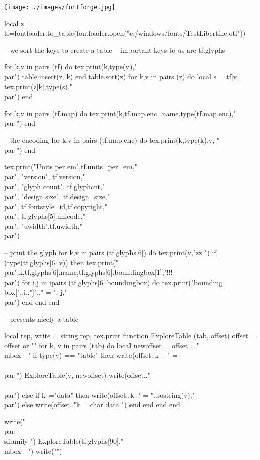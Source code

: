 \documentclass{article}
\begin{document}
\texttt{[image: ./images/fontforge.jpg]}
\newfontfamily{}
\begin{luacode*}
local z={}
tf=fontloader.to_table(fontloader.open("c:/windows/fonts/TestLibertine.otf"))

-- we sort the keys to create a table
-- important keys to us are tf.glyphs

for k,v in pairs (tf) do
   tex.print(k,type(v),"\\par")
   table.insert(z, k)
end
table.sort(z)
for k,v in pairs (z) do
   local s = tf[v]
   tex.print(z[k],type(s),"\\par")
end

for k,v in pairs (tf.map) do
   tex.print(k,tf.map.enc_name,type(tf.map.enc),"\\par ")
end

-- the encoding
for k,v in pairs (tf.map.enc) do
   tex.print(k,type(k),v, "\\par ")
end

tex.print("Units per em",tf.units_per_em,"\\par",
          "version", tf.version,"\\par",
          "glyph count", tf.glyphcnt,"\\par",
          "design size", tf.design_size,"\\par",
           tf.fontstyle_id,tf.copyright,"\\par",
           tf.glyphs[5].unicode,"\\par", 
          "uwidth",tf.uwidth,"\\par")

-- print the glyph
for k,v in pairs (tf.glyphs[6]) do
    tex.print(v,"zz ")
    if (type(tf.glyphs[6].v)) then tex.print("\\par",k,tf.glyphs[6].name,tf.glyphs[6].boundingbox[1],"!!!\\par")  
      for i,j in ipairs (tf.glyphs[6].boundingbox) do
        tex.print("bounding box["..i.."]".." = ", j,"\\par")
      end 
    end
end




-- presents nicely a table 

local rep, write = string.rep, tex.print
function ExploreTable (tab, offset)
    offset = offset or ""
    for k, v in pairs (tab) do
        local newoffset = offset .. "\\mbox{~~}"
        if type(v) == "table" then
           write(offset..k .. " = \\{\\par ")
           ExploreTable(v, newoffset)
           write(offset.."\\}\\par")
        else
         if k~="data" then write(offset..k.." =  "..tostring(v),"\\par") 
           else
                 write(offset.."k = char data ")
           end
       end
    end
end

write("\\par{\\sffamily ")
 ExploreTable(tf.glyphs[90],"\\mbox{~~}")
write("}")

\end{luacode*}
\end{document}
